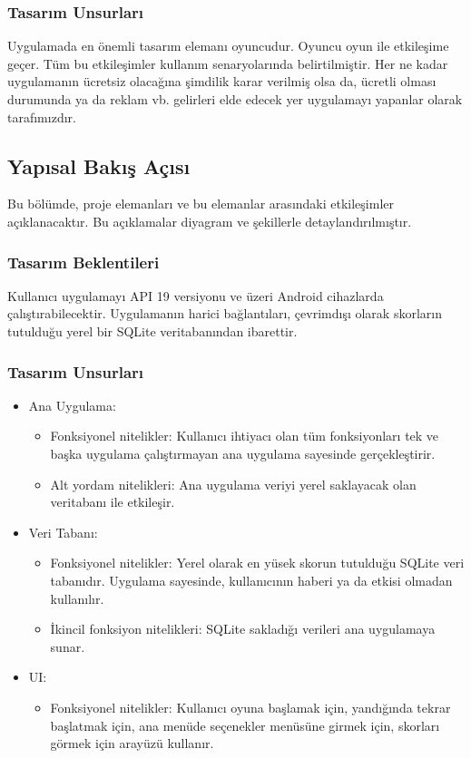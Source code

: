 \documentclass[12pt,a4paper]{article}
\begin{document}
   \subsubsection{Tasarım Unsurları}
   Uygulamada en önemli tasarım elemanı oyuncudur. Oyuncu oyun ile etkileşime geçer. Tüm bu etkileşimler kullanım senaryolarında belirtilmiştir. Her ne kadar uygulamanın ücretsiz olacağına şimdilik karar verilmiş olsa da, ücretli olması durumunda ya da reklam vb. gelirleri elde edecek yer uygulamayı yapanlar olarak tarafımızdır.

   \subsection{Yapısal Bakış Açısı}
   Bu bölümde, proje elemanları ve bu elemanlar arasındaki etkileşimler açıklanacaktır. Bu açıklamalar diyagram ve şekillerle detaylandırılmıştır.

   \subsubsection{Tasarım Beklentileri}
   Kullanıcı uygulamayı API 19 versiyonu ve üzeri Android cihazlarda çalıştırabilecektir. Uygulamanın harici bağlantıları, çevrimdışı olarak skorların tutulduğu yerel bir SQLite veritabanından ibarettir.

   \subsubsection{Tasarım Unsurları}
   \begin{itemize}
      \item Ana Uygulama:
      \begin{itemize}
         \item Fonksiyonel nitelikler: Kullanıcı ihtiyacı olan tüm fonksiyonları tek ve başka uygulama çalıştırmayan ana uygulama sayesinde gerçekleştirir.
         \item Alt yordam nitelikleri: Ana uygulama veriyi yerel saklayacak olan veritabanı ile etkileşir.

      \end{itemize}

      \item Veri Tabanı:
      \begin{itemize}
         \item Fonksiyonel nitelikler: Yerel olarak en yüsek skorun tutulduğu SQLite veri tabanıdır. Uygulama sayesinde, kullanıcının haberi ya da etkisi olmadan kullanılır.
         \item İkincil fonksiyon nitelikleri: SQLite sakladığı verileri ana uygulamaya sunar.
      \end{itemize}

      \item UI:
      \begin{itemize}
         \item Fonksiyonel nitelikler: Kullanıcı oyuna başlamak için, yandığında tekrar başlatmak için, ana menüde seçenekler menüsüne girmek için, skorları görmek için arayüzü kullanır.
      \end{itemize}
   \end{itemize}
\end{document}
